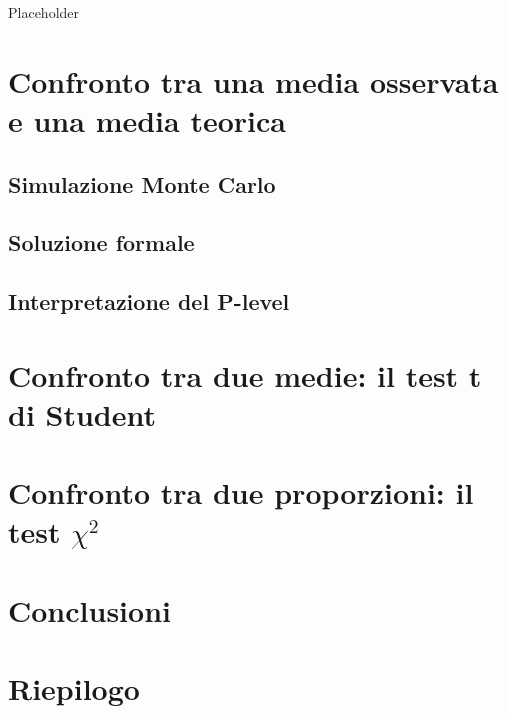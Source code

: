 \documentclass[a4paper,12pt,oneside]{book}
\begin{document}
Placeholder

\hypertarget{confronto-tra-una-media-osservata-e-una-media-teorica}{%
\section{Confronto tra una media osservata e una media teorica}\label{confronto-tra-una-media-osservata-e-una-media-teorica}}

\hypertarget{simulazione-monte-carlo}{%
\subsection{Simulazione Monte Carlo}\label{simulazione-monte-carlo}}

\hypertarget{soluzione-formale}{%
\subsection{Soluzione formale}\label{soluzione-formale}}

\hypertarget{interpretazione-del-p-level}{%
\subsection{Interpretazione del P-level}\label{interpretazione-del-p-level}}

\hypertarget{confronto-tra-due-medie-il-test-t-di-student}{%
\section{Confronto tra due medie: il test t di Student}\label{confronto-tra-due-medie-il-test-t-di-student}}

\hypertarget{confronto-tra-due-proporzioni-il-test-chi2}{%
\section{\texorpdfstring{Confronto tra due proporzioni: il test \(\chi^2\)}{Confronto tra due proporzioni: il test \textbackslash{}chi\^{}2}}\label{confronto-tra-due-proporzioni-il-test-chi2}}

\hypertarget{conclusioni-1}{%
\section{Conclusioni}\label{conclusioni-1}}

\hypertarget{riepilogo}{%
\section{Riepilogo}\label{riepilogo}}
\end{document}
